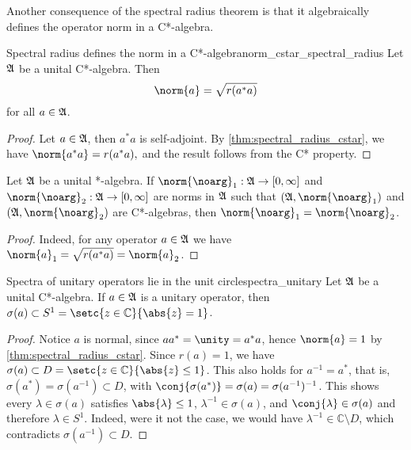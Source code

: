 Another consequence of the spectral radius theorem is that it algebraically defines the operator norm in a C*-algebra.
\begin{proposition}{Spectral radius defines the norm in a C*-algebra}{norm_cstar_spectral_radius}
    Let \(\mathfrak{A}\) be a unital C*-algebra. Then
    \begin{equation*}
        \norm{a} = \sqrt{r(a^*a)}
    \end{equation*}
    for all \(a \in \mathfrak{A}\).
\end{proposition}
\begin{proof}
    Let \(a \in \mathfrak{A}\), then \(a^*a\) is self-adjoint. By \cref{thm:spectral_radius_cstar}, we have \(\norm{a^*a} = r(a^*a),\) and the result follows from the C* property.
\end{proof}
\begin{corollary}
    Let \(\mathfrak{A}\) be a unital *-algebra. If \(\norm{\noarg}_1 : \algebra{A} \to [0,\infty]\) and \(\norm{\noarg}_2 : \algebra{A} \to [0, \infty]\) are norms in \(\mathfrak{A}\) such that \((\algebra{A}, \norm{\noarg}_1)\) and \((\algebra{A},\norm{\noarg}_2)\) are C*-algebras, then \(\norm{\noarg}_1 = \norm{\noarg}_2\).
\end{corollary}
\begin{proof}
    Indeed, for any operator \(a \in \mathfrak{A}\) we have \(\norm{a}_1 = \sqrt{r(a^*a)} = \norm{a}_2\).
\end{proof}

\begin{proposition}{Spectra of unitary operators lie in the unit circle}{spectra_unitary}
    Let \(\mathfrak{A}\) be a unital C*-algebra. If \(a \in \mathfrak{A}\) is a unitary operator, then \(\sigma(a) \subset S^1 = \setc{z \in \mathbb{C}}{\abs{z} = 1}\).
\end{proposition}
\begin{proof}
    Notice \(a\) is normal, since \(aa^* = \unity = a^*a\), hence \(\norm{a} = 1\) by \cref{thm:spectral_radius_cstar}. Since \(r(a) = 1\), we have \(\sigma(a) \subset D = \setc{z \in \mathbb{C}}{\abs{z} \leq 1}\). This also holds for \(a^{-1} = a^*\), that is, \(\sigma(a^*) = \sigma(a^{-1}) \subset D\), with \(\conj{\sigma(a^*)}= \sigma(a) = \sigma(a^{-1})^{-1}\). This shows every \(\lambda \in \sigma(a)\) satisfies \(\abs{\lambda} \leq 1\), \(\lambda^{-1} \in \sigma(a)\), and \(\conj{\lambda} \in \sigma(a)\) and therefore \(\lambda \in S^1\). Indeed, were it not the case, we would have \(\lambda^{-1} \in \mathbb{C} \setminus D\), which contradicts \(\sigma(a^{-1}) \subset D\).
\end{proof}

